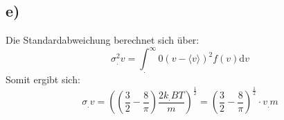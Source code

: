 \subsection*{e)}
Die Standardabweichung berechnet sich über:
\begin{equation}
  \sigma^2_.v=\int^{\infty}_.{0} \left(v-\langle v \rangle \right)^2 f(v) \text{d}v
\end{equation}
Somit ergibt sich:
\begin{equation}
  \sigma_.v = \left(\left( \frac{3}{2}- \frac{8}{\pi}\right) \frac{2k_.BT}{m}\right)^{\frac{1}{2}}=\left( \frac{3}{2}- \frac{8}{\pi}\right)^{\frac{1}{2}}\cdot v_.m
\end{equation}


